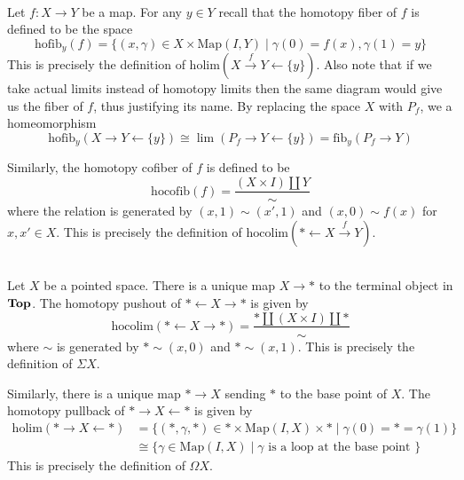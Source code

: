 \documentclass[a4paper]{article}
\begin{document}
\begin{eg}{}{}\\
Let $f:X\to Y$ be a map. For any $y\in Y$ recall that the homotopy fiber of $f$ is defined to be the space $$\text{hofib}_y(f)=\{(x,\gamma)\in X\times\text{Map}(I,Y)\;|\;\gamma(0)=f(x),\gamma(1)=y\}$$ This is precisely the definition of $\text{holim}(X\overset{f}{\rightarrow}Y\leftarrow\{y\})$. Also note that if we take actual limits instead of homotopy limits then the same diagram would give us the fiber of $f$, thus justifying its name. By replacing the space $X$ with $P_f$, we a homeomorphism $$\text{hofib}_{y}(X\rightarrow Y\leftarrow\{y\})\cong\lim(P_f\rightarrow Y\leftarrow\{y\})=\text{fib}_{y}(P_f\rightarrow Y)$$ 

Similarly, the homotopy cofiber of $f$ is defined to be $$\text{hocofib}(f)=\frac{(X\times I)\amalg Y}{\sim}$$ where the relation is generated by $(x,1)\sim(x',1)$ and $(x,0)\sim f(x)$ for $x,x'\in X$. This is precisely the definition of $\text{hocolim}(\ast\leftarrow X\overset{f}{\rightarrow}Y)$. 
\end{eg}

\begin{eg}{}{}\\
Let $X$ be a pointed space. There is a unique map $X\to\ast$ to the terminal object in $\bold{Top}$. The homotopy pushout of $\ast\leftarrow X\rightarrow\ast$ is given by $$\text{hocolim}(\ast\leftarrow X\rightarrow\ast)=\frac{\ast\amalg(X\times I)\amalg\ast}{\sim}$$ where $\sim$ is generated by $\ast\sim(x,0)$ and $\ast\sim(x,1)$. This is precisely the definition of $\Sigma X$. 

Similarly, there is a unique map $\ast\to X$ sending $\ast$ to the base point of $X$. The homotopy pullback of $\ast\rightarrow X\leftarrow\ast$ is given by 
\begin{align*}
\text{holim}(\ast\rightarrow X\leftarrow\ast)&=\{(\ast,\gamma,\ast)\in\ast\times\text{Map}(I,X)\times\ast\;|\;\gamma(0)=\ast=\gamma(1)\}\\
&\cong\{\gamma\in\text{Map}(I,X)\;|\;\gamma\text{ is a loop at the base point }\}
\end{align*}
This is precisely the definition of $\Omega X$. 
\end{eg}
\end{document}
